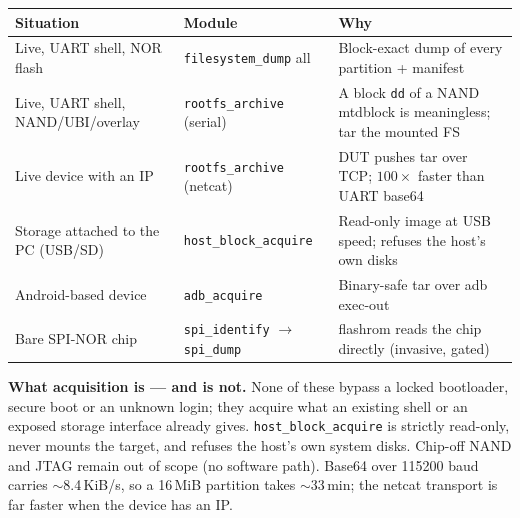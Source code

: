 \documentclass[11pt]{article}
\newif\ifintable\intablefalse
\newcommand{\code}[1]{\ifintable\texttt{#1}\else{\small\colorbox{codebg}{\texttt{#1}}}\fi}
\begin{document}
\begin{table}[h]
\centering\footnotesize\intabletrue
\begin{tabularx}{\textwidth}{@{}L{4.3cm} L{3.6cm} X@{}}
\toprule
\textbf{Situation} & \textbf{Module} & \textbf{Why}\\
\midrule
Live, UART shell, NOR flash & \code{filesystem\_dump} all & Block-exact dump of every partition + manifest\\
Live, UART shell, NAND/UBI/overlay & \code{rootfs\_archive} (serial) & A block \texttt{dd} of a NAND mtdblock is meaningless; tar the mounted FS\\
Live device with an IP & \code{rootfs\_archive} (netcat) & DUT pushes tar over TCP; $100\times$ faster than UART base64\\
Storage attached to the PC (USB/SD) & \code{host\_block\_acquire} & Read-only image at USB speed; refuses the host's own disks\\
Android-based device & \code{adb\_acquire} & Binary-safe tar over adb exec-out\\
Bare SPI-NOR chip & \code{spi\_identify} $\rightarrow$ \code{spi\_dump} & flashrom reads the chip directly (invasive, gated)\\
\bottomrule
\end{tabularx}
\end{table}

\begin{warnbox}
\textbf{What acquisition is --- and is not.} None of these bypass a locked
bootloader, secure boot or an unknown login; they acquire what an existing shell
or an exposed storage interface already gives. \code{host\_block\_acquire} is
strictly read-only, never mounts the target, and refuses the host's own system
disks. Chip-off NAND and JTAG remain out of scope (no software path). Base64 over
115200 baud carries $\sim$8.4\,KiB/s, so a 16\,MiB partition takes $\sim$33\,min;
the netcat transport is far faster when the device has an IP.
\end{warnbox}

\end{document}
